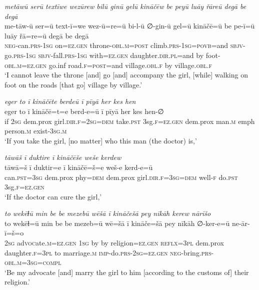 \ea \label{ŽP.161}
\textit{metāwū serū textīwe wezūrew bilū ginū gelū kināčēw be peyū luāy řāreū degā be degā} \\ 
\gll me-tāw-ū ser=ū text-ī=we wez-ū=re=ū bi-l-ū ∅-gin-ū gel=ū kināčē=ū be pe-ī=ū luāy řā=re=ū degā be degā \\ 
 \textsc{neg-}can\textsc{.prs}\textsc{-\textsc{1sg}} on\textsc{\textsc{=ez.gen}} throne\textsc{-obl}\textsc{.m}\textsc{=\textsc{post}} climb\textsc{.prs}\textsc{-\textsc{1sg}}\textsc{=\textsc{povb}}=and \textsc{sbjv-}go\textsc{.prs}\textsc{-\textsc{1sg}} \textsc{sbjv-}fall\textsc{.prs}\textsc{-\textsc{1sg}} with\textsc{\textsc{=ez.gen}} daughter\textsc{.dir}\textsc{.pl}=and by foot\textsc{-obl}\textsc{.m}\textsc{\textsc{=ez.gen}} go.inf road\textsc{.f}\textsc{=\textsc{post}}=and village\textsc{.obl}\textsc{.f} by village\textsc{.obl}\textsc{.f} \\ 
\glt `I cannot leave the throne [and] go [and] accompany the girl, [while] walking on foot on the roads [that go] village by village.'
\z 
 
\ea \label{ŽP.163}
\textit{eger to ī kināčēte berdeū ī pīyā her kes hen} \\ 
\gll eger to ī kināčē=t=e berd-e=ū ī pīyā her kes hen-∅ \\ 
 if \textsc{2sg} dem.prox girl\textsc{.dir}\textsc{.f}\textsc{=\textsc{2sg}}\textsc{=dem} take\textsc{.pst} 3sg\textsc{.f}\textsc{\textsc{=ez.gen}} dem.prox man\textsc{.m} emph person\textsc{.m} exist\textsc{-3sg}\textsc{.m} \\ 
\glt `If you take the girl, [no matter] who this man (the doctor) is,'
\z 
 
\ea \label{ŽP.164}
\textit{tāwāš ī duktire ī kināčēše weše kerdew} \\ 
\gll tāwā=š ī duktir=e ī kināčē=š=e weš-e kerd-e=ū \\ 
 can\textsc{.pst}\textsc{=3sg} dem.prox phy\textsc{=dem} dem.prox girl\textsc{.dir}\textsc{.f}\textsc{=3sg}\textsc{=dem} well\textsc{-f} do\textsc{.pst} 3sg\textsc{.f}\textsc{\textsc{=ez.gen}} \\ 
\glt `If the doctor can cure the girl,'
\z 
 
\ea \label{ŽP.165}
\textit{to wekēɫū min be be mezebū wēšā ī kināčešā pey nīkāh kerew nārīšo} \\ 
\gll to wekēɫ=ū min be be mezeb=ū wē=šā ī kināče=šā pey nīkāh ∅-ker-e=ū ne-ār-ī=š=o \\ 
 \textsc{2sg} ad\textsc{voc}ate\textsc{.m}\textsc{\textsc{=ez.gen}} \textsc{1sg} by by religion\textsc{\textsc{=ez.gen}} \textsc{reflx}\textsc{=3pl} dem.prox daughter\textsc{.f}\textsc{=3pl} to marriage\textsc{.m} \textsc{imp-}do\textsc{.prs}-\textsc{2sg}\textsc{\textsc{=ez.gen}} \textsc{neg-}bring\textsc{.prs}\textsc{-obl}\textsc{.m}\textsc{=3sg}\textsc{=compl} \\ 
\glt `Be my advocate [and] marry the girl to him [according to the customs of] their religion.'
\z 
 
